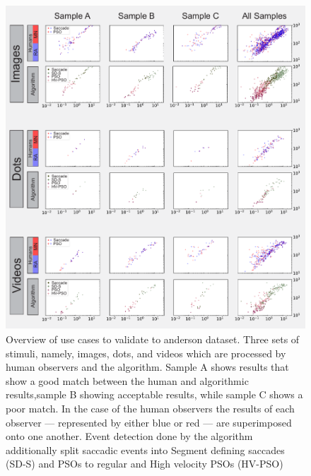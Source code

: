 \begin{figure}[!ht]
\centering
\includegraphics[width=1\textwidth]{Mainseqs_legends.pdf}
\caption{\label{fig:Mainseqs}Overview of use cases to validate to anderson dataset. Three sets of stimuli, namely, images, dots, and videos which are processed by human observers and the algorithm. Sample A shows results that show a good match between the human and algorithmic results,sample B showing acceptable results, while sample C shows a poor match. In the case of the human observers the results of each observer --- represented by either blue or red --- are superimposed onto one another. Event detection done by the algorithm additionally split saccadic events into Segment defining saccades (SD-S) and PSOs to regular and High velocity PSOs (HV-PSO)  }

\end{figure}



